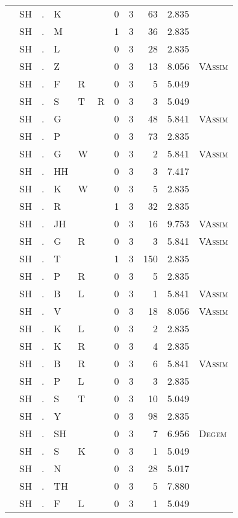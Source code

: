 \begin{longtable}{r@{ } r@{ } c@{ } l@{ } l@{ } l@{ } r r r r l }
 & SH & . & K &  &  & 0 & 3 & 63 & 2.835 &  \\
 & SH & . & M &  &  & 1 & 3 & 36 & 2.835 &  \\
 & SH & . & L &  &  & 0 & 3 & 28 & 2.835 &  \\
 & SH & . & Z &  &  & 0 & 3 & 13 & 8.056 & \textsc{VAssim} \\
 & SH & . & F & R &  & 0 & 3 & 5 & 5.049 &  \\
 & SH & . & S & T & R & 0 & 3 & 3 & 5.049 &  \\
 & SH & . & G &  &  & 0 & 3 & 48 & 5.841 & \textsc{VAssim} \\
 & SH & . & P &  &  & 0 & 3 & 73 & 2.835 &  \\
 & SH & . & G & W &  & 0 & 3 & 2 & 5.841 & \textsc{VAssim} \\
 & SH & . & HH &  &  & 0 & 3 & 3 & 7.417 &  \\
 & SH & . & K & W &  & 0 & 3 & 5 & 2.835 &  \\
 & SH & . & R &  &  & 1 & 3 & 32 & 2.835 &  \\
 & SH & . & JH &  &  & 0 & 3 & 16 & 9.753 & \textsc{VAssim} \\
 & SH & . & G & R &  & 0 & 3 & 3 & 5.841 & \textsc{VAssim} \\
 & SH & . & T &  &  & 1 & 3 & 150 & 2.835 &  \\
 & SH & . & P & R &  & 0 & 3 & 5 & 2.835 &  \\
 & SH & . & B & L &  & 0 & 3 & 1 & 5.841 & \textsc{VAssim} \\
 & SH & . & V &  &  & 0 & 3 & 18 & 8.056 & \textsc{VAssim} \\
 & SH & . & K & L &  & 0 & 3 & 2 & 2.835 &  \\
 & SH & . & K & R &  & 0 & 3 & 4 & 2.835 &  \\
 & SH & . & B & R &  & 0 & 3 & 6 & 5.841 & \textsc{VAssim} \\
 & SH & . & P & L &  & 0 & 3 & 3 & 2.835 &  \\
 & SH & . & S & T &  & 0 & 3 & 10 & 5.049 &  \\
 & SH & . & Y &  &  & 0 & 3 & 98 & 2.835 &  \\
 & SH & . & SH &  &  & 0 & 3 & 7 & 6.956 & \textsc{Degem} \\
 & SH & . & S & K &  & 0 & 3 & 1 & 5.049 &  \\
 & SH & . & N &  &  & 0 & 3 & 28 & 5.017 &  \\
 & SH & . & TH &  &  & 0 & 3 & 5 & 7.880 &  \\
 & SH & . & F & L &  & 0 & 3 & 1 & 5.049 &  \\

\end{longtable}
